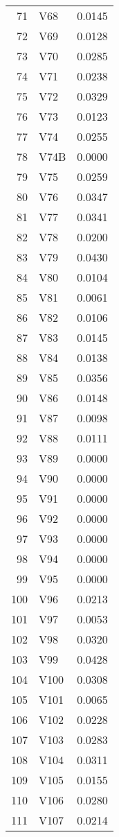 \documentclass{amsart}
\begin{document}
\begin{longtable}{rlr}
  71 & V68 & 0.0145 \\ 
  72 & V69 & 0.0128 \\ 
  73 & V70 & 0.0285 \\ 
  74 & V71 & 0.0238 \\ 
  75 & V72 & 0.0329 \\ 
  76 & V73 & 0.0123 \\ 
  77 & V74 & 0.0255 \\ 
  78 & V74B & 0.0000 \\ 
  79 & V75 & 0.0259 \\ 
  80 & V76 & 0.0347 \\ 
  81 & V77 & 0.0341 \\ 
  82 & V78 & 0.0200 \\ 
  83 & V79 & 0.0430 \\ 
  84 & V80 & 0.0104 \\ 
  85 & V81 & 0.0061 \\ 
  86 & V82 & 0.0106 \\ 
  87 & V83 & 0.0145 \\ 
  88 & V84 & 0.0138 \\ 
  89 & V85 & 0.0356 \\ 
  90 & V86 & 0.0148 \\ 
  91 & V87 & 0.0098 \\ 
  92 & V88 & 0.0111 \\ 
  93 & V89 & 0.0000 \\ 
  94 & V90 & 0.0000 \\ 
  95 & V91 & 0.0000 \\ 
  96 & V92 & 0.0000 \\ 
  97 & V93 & 0.0000 \\ 
  98 & V94 & 0.0000 \\ 
  99 & V95 & 0.0000 \\ 
  100 & V96 & 0.0213 \\ 
  101 & V97 & 0.0053 \\ 
  102 & V98 & 0.0320 \\ 
  103 & V99 & 0.0428 \\ 
  104 & V100 & 0.0308 \\ 
  105 & V101 & 0.0065 \\ 
  106 & V102 & 0.0228 \\ 
  107 & V103 & 0.0283 \\ 
  108 & V104 & 0.0311 \\ 
  109 & V105 & 0.0155 \\ 
  110 & V106 & 0.0280 \\ 
  111 & V107 & 0.0214 \\ 

\end{longtable}
\end{document}
